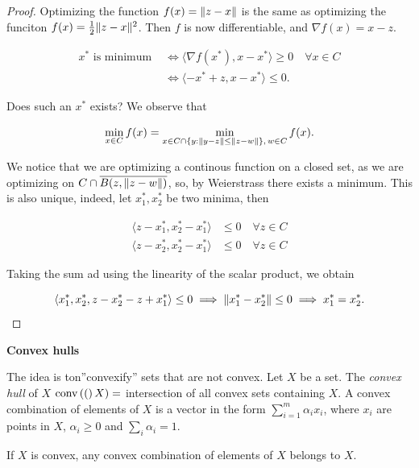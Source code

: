 \begin{proof}
    
    Optimizing the function $f(x) = \lVert z-x \rVert$ is the same as optimizing the funciton $f(x) = \frac12 \lVert z-x \rVert^2$. Then $f$ is now differentiable, and $\nabla f(x) = x-z$. 

    \begin{align*}
        x^* \text{ is minimum }&\iff \langle \nabla f(x^*), x - x^* \rangle \ge 0 \quad \forall x \in C \\
        &\iff \langle -x^* + z, x - x^* \rangle \le 0.
    \end{align*}

    Does such an $x^*$ exists? We observe that 

    \[ \min_{x \in C} f(x) = \min_{x \in C \cap \left\{ y : \lVert y-z \rVert \le \lVert z-w \rVert \right\}, \, w \in C} f(x). \]

    We notice that we are optimizing a continous function on a closed set, as we are optimizing on $C \cap \overline{B(z,\lVert z-w \rVert)}$, so, by Weierstrass there exists a minimum. This is also unique, indeed, let $x^*_1,x^*_2$ be two minima, then 

    \begin{align*}
        \langle z - x^*_1, x^*_2-x^*_1 \rangle &\le 0 \quad \forall z \in C \\
        \langle z - x^*_2, x^*_2-x^*_1 \rangle &\le 0 \quad \forall z \in C
    \end{align*}

    Taking the sum ad using the linearity of the scalar product, we obtain 

    \[ \langle x_1^*, x_2^*, z -x^*_2 - z + x^*_1 \rangle \le 0 \implies \lVert x_1^*-x_2^* \rVert \le 0 \implies x_1^* = x^*_2. \]

\end{proof}

\large\textbf{Convex hulls}
\normalsize

The idea is ton''convexify'' sets that are not convex. Let $X$ be a set. The \emph{convex hull} of $X$ $\mathrm{conv}\left((\right)X) = $ intersection of all convex sets containing $X$. A convex combination of elements of $X$ is a vector in the form $\sum_{i=1}^m \alpha_i x_i$, where $x_i$ are points in $X$, $\alpha_i \ge 0$ and $\sum_i \alpha_i = 1$.

\begin{remark}
    
    If $X$ is convex, any convex combination of elements of $X$ belongs to $X$. 

\end{remark}


